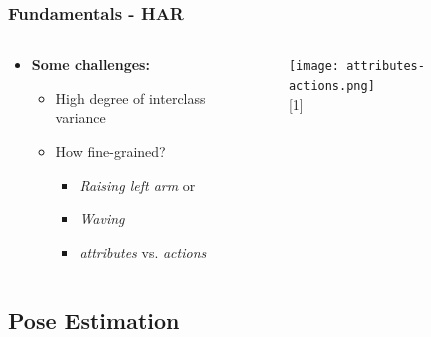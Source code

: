 \documentclass[9pt]{beamer}
\providecommand{\sourcefix}[1]{\\ \footnotesize \tugreen{Source:} [#1]}
\newenvironment{myframe}[1][]{%
\begin{frame}%
\frametitle{#1}
\setcounter{footnote}{0}


}{%
\end{frame}%
}
\begin{document}
\begin{myframe}[Fundamentals - HAR]
    \note[item]{}
    \begin{columns}
        \begin{column}{.48\linewidth}
            \begin{itemize}
                \item \textbf{Some challenges:}
                    \begin{itemize}
                        \item High degree of interclass variance
                        \item How fine-grained?
                        \begin{itemize}
                            \item \textit{Raising left arm} or
                            \item \textit{Waving}
                            \item \textit{attributes} vs. \textit{actions} \footnotemark
                        \end{itemize}
                    \end{itemize}
            \end{itemize}        
        \end{column}
        \begin{column}{.48\linewidth}
            \begin{figure}
                \texttt{[image: attributes-actions.png]}
                \sourcefix{1}
            \end{figure}
        \end{column}
    \end{columns}
\end{myframe}

\subsection{Pose Estimation}
\end{document}

